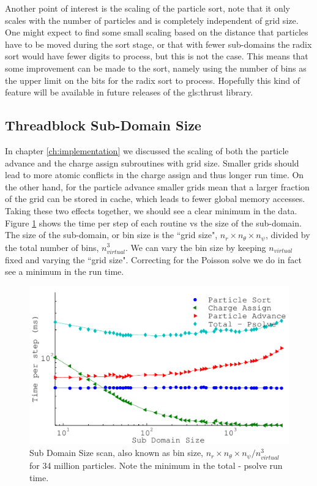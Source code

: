 Another point of interest is the scaling of the particle sort, note that it only scales with the number of particles and is completely independent of grid size. One might expect to find some small scaling based on the distance that particles have to be moved during the sort stage, or that with fewer sub-domains the radix sort would have fewer digits to process, but this is not the case. This means that some improvement can be made to the sort, namely using the number of bins as the upper limit on the bits for the radix sort to process. Hopefully this kind of feature will be available in future releases of the \gls{gls:thrust} library.



\subsection{Threadblock Sub-Domain Size}
\label{sec:subdomain_size}
In chapter \ref{ch:implementation} we discussed the scaling of both the particle advance and the charge assign subroutines with grid size. Smaller grids should lead to more atomic conflicts in the charge assign and thus longer run time. On the other hand, for the particle advance smaller grids mean that a larger fraction of the grid can be stored in cache, which leads to fewer global memory accesses. Taking these two effects together, we should see a clear minimum in the data. Figure \ref{fig:subdomain_size_scan} shows the time per step of each routine vs the size of the sub-domain. The size of the sub-domain, or bin size is the ``grid size", $n_r\times n_{\theta} \times n_{\psi}$, divided by the total number of bins, $n_{virtual}^3$. We can vary the bin size by keeping $n_{virtual}$ fixed and varying the ``grid size". Correcting for the Poisson solve we do in fact see a minimum in the run time. 

\begin{figure}[H]
\begin{center}
\includegraphics[width=6in]{performance/gridshape_scan.pdf}
\end{center}
\caption[Sub Domain Size scan]{Sub Domain Size scan, also known as bin size, $n_r\times n_{\theta} \times n_{\psi}/n_{virtual}^3$ for 34 million particles. Note the minimum in the total - psolve run time.}
\label{fig:subdomain_size_scan}
\end{figure}


